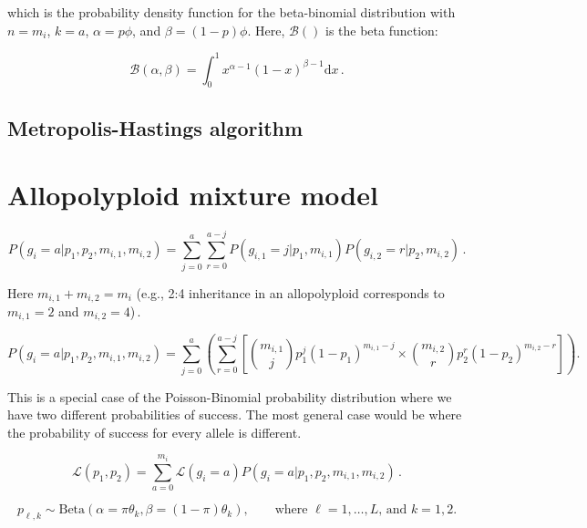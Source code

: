 \documentclass[11pt,english,letterpaper,oneside]{article}
\begin{document}
which is the probability density function for the beta-binomial distribution with $n = m_i$, $k = a$, $\alpha = p\phi$, and $\beta = (1 - p)\phi$. Here, $\mathcal{B}()$ is the beta function:

\begin{equation*}
\mathcal{B}(\alpha,\beta) = \int_0^1 x^{\alpha-1} (1 - x)^{\beta - 1} \text{d}x\, .
\end{equation*}

\subsection{Metropolis-Hastings algorithm}



\section{Allopolyploid mixture model}

\begin{equation}
P(g_i = a|p_1, p_2, m_{i,1}, m_{i,2}) = \sum_{j=0}^a \sum_{r=0}^{a-j} P(g_{i,1} = j|p_1, m_{i,1})P(g_{i,2} = r | p_2, m_{i,2})\,.
\end{equation}

Here $m_{i,1} + m_{i,2} = m_i$ (e.g., 2:4 inheritance in an allopolyploid corresponds to $m_{i,1}=2$ and $m_{i,2}=4$)\,.

\begin{equation}
P(g_i = a|p_1, p_2, m_{i,1}, m_{i,2}) = \sum_{j=0}^a \left(  \sum_{r=0}^{a-j} \left[ \binom{m_{i,1}}{j} p_1^j (1 - p_1)^{m_{i,1} - j} \times \binom{m_{i,2}}{r} p_2^r (1 - p_2)^{m_{i,2} - r} \right] \right).
\end{equation}

This is a special case of the Poisson-Binomial probability distribution where we have two different probabilities of success. The most general case would be where the probability of success for every allele is different.

\begin{equation}
\mathcal{L}(p_1,p_2) = \sum_{a=0}^{m_i} \mathcal{L}(g_i = a) P(g_i = a|p_1, p_2, m_{i,1}, m_{i,2})\,.
\end{equation}

\begin{equation}
p_{\ell,k} \sim \text{Beta}(\alpha = \pi \theta_k, \beta = (1 - \pi) \theta_k), \qquad \text{where } \ell = 1,\ldots,L \text{,  and  } k = 1,2.
\end{equation}
\end{document}
